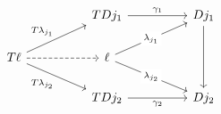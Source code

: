 \[\begin{tikzcd}
	&& {TDj_{1}} && {Dj_{1}} \\
	T\ell && \ell \\
	&& {TDj_{2}} && {Dj_{2}}
	\arrow["{\lambda_{j_{1}}}"{description}, from=2-3, to=1-5]
	\arrow["{\lambda_{j_{2}}}"{description}, from=2-3, to=3-5]
	\arrow[from=1-5, to=3-5]
	\arrow[dashed, from=2-1, to=2-3]
	\arrow["{\gamma_{2}}"', from=3-3, to=3-5]
	\arrow["{\gamma_{1}}", from=1-3, to=1-5]
	\arrow["{T\lambda_{j_{1}}}", from=2-1, to=1-3]
	\arrow["{T\lambda_{j_{2}}}"', from=2-1, to=3-3]
\end{tikzcd}\]